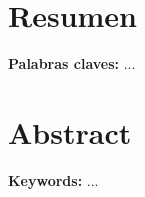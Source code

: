 \section*{Resumen}

\textbf{Palabras claves:} ...


\newpage


\section*{Abstract}


\textbf{Keywords:} ...